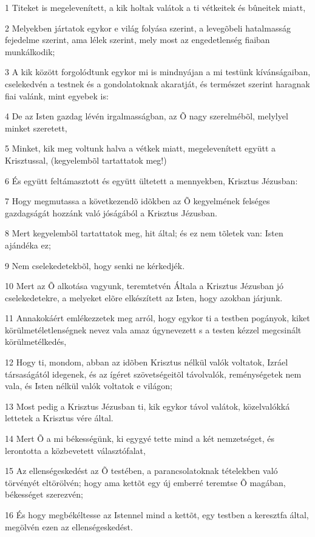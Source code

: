 \par 1 Titeket is megelevenített, a kik holtak valátok a ti vétkeitek és bûneitek miatt,
\par 2 Melyekben jártatok egykor e világ folyása szerint, a levegõbeli hatalmasság fejedelme szerint, ama lélek szerint, mely most az engedetlenség fiaiban munkálkodik;
\par 3 A kik között forgolódtunk egykor mi is mindnyájan a mi testünk kívánságaiban, cselekedvén a testnek és a gondolatoknak akaratját, és természet szerint haragnak fiai valánk, mint egyebek is:
\par 4 De az Isten gazdag lévén irgalmasságban, az Õ nagy szerelmébõl, melylyel minket szeretett,
\par 5 Minket, kik meg voltunk halva a vétkek miatt, megelevenített együtt a Krisztussal, (kegyelembõl tartattatok meg!)
\par 6 És együtt feltámasztott és együtt ültetett a mennyekben, Krisztus Jézusban:
\par 7 Hogy megmutassa a következendõ idõkben az Õ kegyelmének felséges gazdagságát hozzánk való jóságából a Krisztus Jézusban.
\par 8 Mert kegyelembõl tartattatok meg, hit által; és ez nem tõletek van: Isten ajándéka ez;
\par 9 Nem cselekedetekbõl, hogy senki ne kérkedjék.
\par 10 Mert az Õ alkotása vagyunk, teremtetvén Általa a Krisztus Jézusban jó cselekedetekre, a melyeket elõre elkészített az Isten, hogy azokban járjunk.
\par 11 Annakokáért emlékezzetek meg arról, hogy egykor ti a testben pogányok, kiket körülmetéletlenségnek nevez vala amaz úgynevezett s a testen kézzel megcsinált körülmetélkedés,
\par 12 Hogy ti, mondom, abban az idõben Krisztus nélkül valók voltatok, Izráel társaságától idegenek, és az ígéret szövetségeitõl távolvalók, reménységetek nem vala, és Isten nélkül valók voltatok e világon;
\par 13 Most pedig a Krisztus Jézusban ti, kik egykor távol valátok, közelvalókká lettetek a Krisztus vére által.
\par 14 Mert Õ a mi békességünk, ki egygyé tette mind a két nemzetséget, és lerontotta a közbevetett választófalat,
\par 15 Az ellenségeskedést az Õ testében, a parancsolatoknak tételekben való törvényét eltörölvén; hogy ama kettõt egy új emberré teremtse Õ magában, békességet szerezvén;
\par 16 És hogy megbékéltesse az Istennel mind a kettõt, egy testben a keresztfa által, megölvén ezen az ellenségeskedést.
